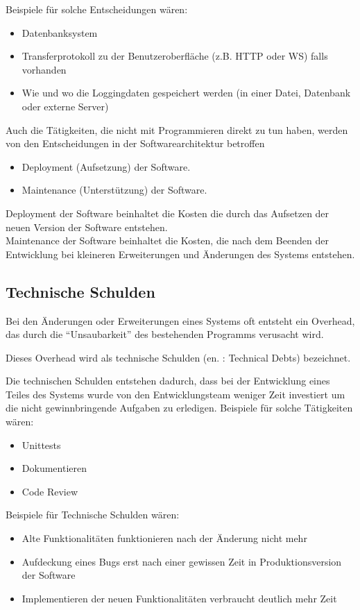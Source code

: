\documentclass{article}
\begin{document}
    Beispiele für solche Entscheidungen wären:
    \begin{itemize}
        \item Datenbanksystem
        \item Transferprotokoll zu der Benutzeroberfläche (z.B. HTTP oder WS) falls vorhanden
        \item Wie und wo die Loggingdaten gespeichert werden (in einer Datei, Datenbank oder externe Server)
    \end{itemize}

    Auch die Tätigkeiten, die nicht mit Programmieren direkt zu tun haben, werden von den Entscheidungen in der Softwarearchitektur betroffen
    \begin{itemize}
        \item Deployment (Aufsetzung) der Software.
        \item Maintenance (Unterstützung) der Software.
    \end{itemize}

    Deployment der Software beinhaltet die Kosten die durch das Aufsetzen der neuen Version der Software entstehen.\\
    Maintenance der Software beinhaltet die Kosten, die nach dem Beenden der Entwicklung bei kleineren Erweiterungen und Änderungen des Systems entstehen.


    \subsection{Technische Schulden}
    Bei den Änderungen oder Erweiterungen eines Systems oft entsteht ein Overhead, das durch die ``Unsaubarkeit'' des bestehenden Programms verusacht wird.

    Dieses Overhead wird als technische Schulden (en. : Technical Debts) bezeichnet.

    Die technischen Schulden entstehen dadurch, dass bei der Entwicklung eines Teiles des Systems wurde 
    von den Entwicklungsteam weniger Zeit investiert um die nicht gewinnbringende Aufgaben zu erledigen.
    Beispiele für solche Tätigkeiten wären:
    \begin{itemize}
        \item Unittests
        \item Dokumentieren 
        \item Code Review
    \end{itemize}

    Beispiele für Technische Schulden wären:
    \begin{itemize}
        \item Alte Funktionalitäten funktionieren nach der Änderung nicht mehr
        \item Aufdeckung eines Bugs erst nach einer gewissen Zeit in Produktionsversion der Software
        \item Implementieren der neuen Funktionalitäten verbraucht deutlich mehr Zeit
    \end{itemize}
\end{document}
